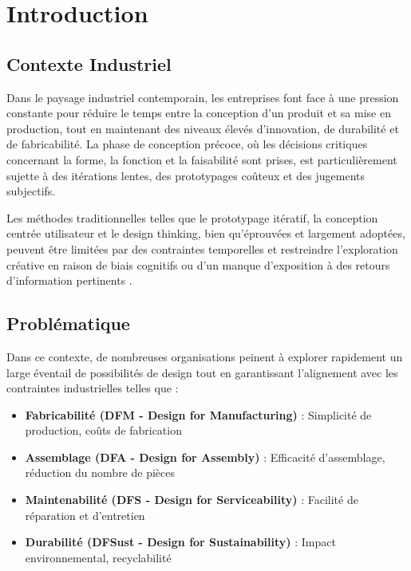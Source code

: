 \section{Introduction}

\subsection{Contexte Industriel}

Dans le paysage industriel contemporain, les entreprises font face à une pression constante pour réduire le temps entre la conception d'un produit et sa mise en production, tout en maintenant des niveaux élevés d'innovation, de durabilité et de fabricabilité. La phase de conception précoce, où les décisions critiques concernant la forme, la fonction et la faisabilité sont prises, est particulièrement sujette à des itérations lentes, des prototypages coûteux et des jugements subjectifs.

Les méthodes traditionnelles telles que le prototypage itératif, la conception centrée utilisateur et le design thinking, bien qu'éprouvées et largement adoptées, peuvent être limitées par des contraintes temporelles et restreindre l'exploration créative en raison de biais cognitifs ou d'un manque d'exposition à des retours d'information pertinents \cite{bartlett2024generative}.

\subsection{Problématique}

Dans ce contexte, de nombreuses organisations peinent à explorer rapidement un large éventail de possibilités de design tout en garantissant l'alignement avec les contraintes industrielles telles que :

\begin{itemize}[leftmargin=*]
    \item \textbf{Fabricabilité (DFM - Design for Manufacturing)} : Simplicité de production, coûts de fabrication
    \item \textbf{Assemblage (DFA - Design for Assembly)} : Efficacité d'assemblage, réduction du nombre de pièces
    \item \textbf{Maintenabilité (DFS - Design for Serviceability)} : Facilité de réparation et d'entretien
    \item \textbf{Durabilité (DFSust - Design for Sustainability)} : Impact environnemental, recyclabilité
\end{itemize}


